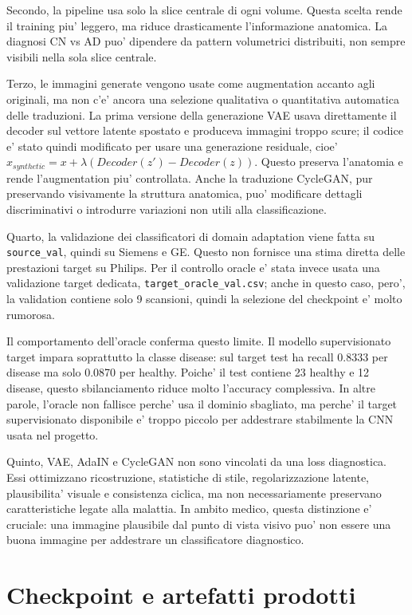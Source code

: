 \documentclass[12pt,a4paper]{article}
\begin{document}
Secondo, la pipeline usa solo la slice centrale di ogni volume. Questa scelta rende il training piu' leggero, ma riduce drasticamente l'informazione anatomica. La diagnosi CN vs AD puo' dipendere da pattern volumetrici distribuiti, non sempre visibili nella sola slice centrale.

Terzo, le immagini generate vengono usate come augmentation accanto agli originali, ma non c'e' ancora una selezione qualitativa o quantitativa automatica delle traduzioni. La prima versione della generazione VAE usava direttamente il decoder sul vettore latente spostato e produceva immagini troppo scure; il codice e' stato quindi modificato per usare una generazione residuale, cioe' \(x_{synthetic}=x+\lambda(Decoder(z')-Decoder(z))\). Questo preserva l'anatomia e rende l'augmentation piu' controllata. Anche la traduzione CycleGAN, pur preservando visivamente la struttura anatomica, puo' modificare dettagli discriminativi o introdurre variazioni non utili alla classificazione.

Quarto, la validazione dei classificatori di domain adaptation viene fatta su \texttt{source\_val}, quindi su Siemens e GE. Questo non fornisce una stima diretta delle prestazioni target su Philips. Per il controllo oracle e' stata invece usata una validazione target dedicata, \texttt{target\_oracle\_val.csv}; anche in questo caso, pero', la validation contiene solo 9 scansioni, quindi la selezione del checkpoint e' molto rumorosa.

Il comportamento dell'oracle conferma questo limite. Il modello supervisionato target impara soprattutto la classe disease: sul target test ha recall 0.8333 per disease ma solo 0.0870 per healthy. Poiche' il test contiene 23 healthy e 12 disease, questo sbilanciamento riduce molto l'accuracy complessiva. In altre parole, l'oracle non fallisce perche' usa il dominio sbagliato, ma perche' il target supervisionato disponibile e' troppo piccolo per addestrare stabilmente la CNN usata nel progetto.

Quinto, VAE, AdaIN e CycleGAN non sono vincolati da una loss diagnostica. Essi ottimizzano ricostruzione, statistiche di stile, regolarizzazione latente, plausibilita' visuale e consistenza ciclica, ma non necessariamente preservano caratteristiche legate alla malattia. In ambito medico, questa distinzione e' cruciale: una immagine plausibile dal punto di vista visivo puo' non essere una buona immagine per addestrare un classificatore diagnostico.

\section{Checkpoint e artefatti prodotti}
\end{document}
